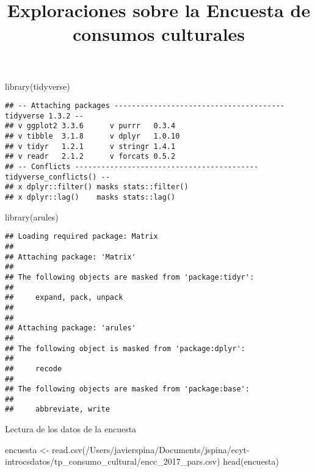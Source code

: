 \documentclass[
]{article}
\title{Exploraciones sobre la Encuesta de consumos culturales}
\author{}
\date{\vspace{-2.5em}}
\newenvironment{Shaded}{\begin{snugshade}}{\end{snugshade}}
\newcommand{\FunctionTok}[1]{\textcolor[rgb]{0.00,0.00,0.00}{#1}}
\newcommand{\NormalTok}[1]{#1}
\newcommand{\OtherTok}[1]{\textcolor[rgb]{0.56,0.35,0.01}{#1}}
\newcommand{\StringTok}[1]{\textcolor[rgb]{0.31,0.60,0.02}{#1}}
\begin{document}
\maketitle

\begin{Shaded}
\begin{Highlighting}[]
\FunctionTok{library}\NormalTok{(tidyverse)}
\end{Highlighting}
\end{Shaded}

\begin{verbatim}
## -- Attaching packages --------------------------------------- tidyverse 1.3.2 --
## v ggplot2 3.3.6      v purrr   0.3.4 
## v tibble  3.1.8      v dplyr   1.0.10
## v tidyr   1.2.1      v stringr 1.4.1 
## v readr   2.1.2      v forcats 0.5.2 
## -- Conflicts ------------------------------------------ tidyverse_conflicts() --
## x dplyr::filter() masks stats::filter()
## x dplyr::lag()    masks stats::lag()
\end{verbatim}

\begin{Shaded}
\begin{Highlighting}[]
\FunctionTok{library}\NormalTok{(arules)}
\end{Highlighting}
\end{Shaded}

\begin{verbatim}
## Loading required package: Matrix
## 
## Attaching package: 'Matrix'
## 
## The following objects are masked from 'package:tidyr':
## 
##     expand, pack, unpack
## 
## 
## Attaching package: 'arules'
## 
## The following object is masked from 'package:dplyr':
## 
##     recode
## 
## The following objects are masked from 'package:base':
## 
##     abbreviate, write
\end{verbatim}

Lectura de los datos de la encuesta

\begin{Shaded}
\begin{Highlighting}[]
\NormalTok{encuesta }\OtherTok{\textless{}{-}} \FunctionTok{read.csv}\NormalTok{(}\StringTok{\textquotesingle{}/Users/javierspina/Documents/jspina/ecyt{-}introcsdatos/tp\_consumo\_cultural/encc\_2017\_pars.csv\textquotesingle{}}\NormalTok{)}
\FunctionTok{head}\NormalTok{(encuesta)}
\end{Highlighting}
\end{Shaded}
\end{document}

